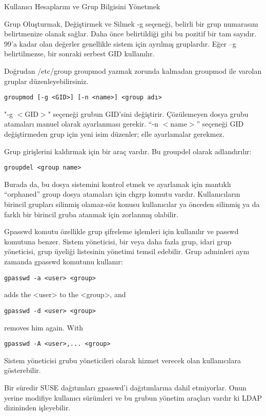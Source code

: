 \begin{section}{Kullanıcı Hesaplarını ve Grup Bilgisini Yönetmek}
\begin{subsection}{Grup Oluşturmak, Değiştirmek ve Silmek}
-g seçeneği, belirli bir grup numarasını belirtmenize olanak sağlar. Daha önce belirtildiği gibi bu pozitif bir tam sayıdır. 99'a kadar olan değerler genellikle sistem için ayrılmış gruplardır. Eğer –g belirtilmezse, bir sonraki serbest GID kullanılır.

Doğrudan /etc/group groupmod yazmak zorunda kalmadan groupmod ile varolan gruplar düzenleyebilirsiniz.
\begin{verbatim}
groupmod [-g <GID>] [-n <name>] <group adı>
\end{verbatim}

"-g $<$GID$>$" seçeneği grubun GID'sini değiştirir. Çözülemeyen dosya grubu atamaları
manuel olarak ayarlanması gerekir. “-n $<$name$>$” seçeneği GID değiştirmeden grup için yeni isim düzenler; elle ayarlamalar gerekmez.

Grup girişlerini kaldırmak için bir araç vardır. Bu groupdel olarak adlandırılır:
\begin{verbatim}
groupdel <group name>
\end{verbatim}

Burada da, bu dosya sistemini kontrol etmek ve ayarlamak için mantıklı “orphaned” group dosya atamaları için chgrp komutu vardır. Kullanıcıların birincil grupları silinmiş olamaz-söz konusu kullanıcılar ya önceden silinmiş ya da farklı bir birincil gruba atanmak için zorlanmış olabilir.

Gpasswd komutu özellikle grup şifreleme işlemleri için kullanılır ve
passwd komutuna benzer. Sistem yöneticisi, bir veya daha fazla grup, idari grup yöneticisi, grup üyeliği listesinin yönetimi temsil edebilir. Grup adminleri aynı zamanda gpasswd komutunu kullanır:
\begin{verbatim}
gpasswd -a <user> <group>
\end{verbatim}

adds the <user> to the <group>, and
\begin{verbatim}
gpasswd -d <user> <group>
\end{verbatim}

removes him again. With
\begin{verbatim}
gpasswd -A <user>,... <group>
\end{verbatim}

Sistem yöneticisi grubu yöneticileri olarak hizmet verecek olan kullanıcılara gösterebilir.

Bir süredir SUSE dağıtımları gpasswd'i dağıtımlarına dahil etmiyorlar. Onun yerine
modifiye kullanıcı sürümleri ve bu grubun yönetim araçları vardır ki LDAP dizininden işleyebilir.


\end{subsection}
\end{section}
